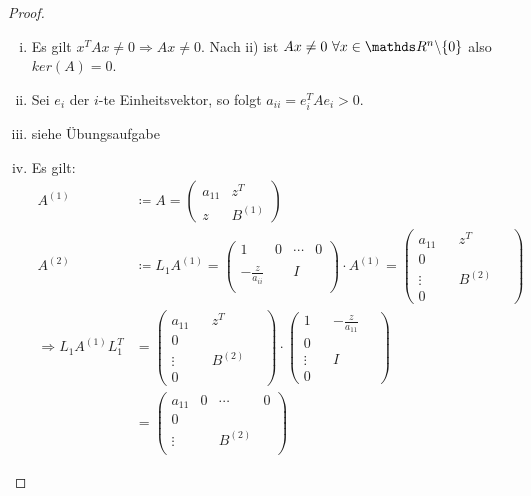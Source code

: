 \begin{proof}~
  \begin{enumerate}[i)]
  \item Es gilt $x^TAx\neq 0\Rightarrow Ax\neq 0$. 
    Nach ii) ist $Ax\neq 0~\forall x\in\Ren\backslash \{0\}$
    also $ker(A)=0$. %
  \item Sei $e_i$ der $i$-te Einheitsvektor, so folgt $a_{ii} = e_{i}^TAe_i > 0$.
  \item siehe Übungsaufgabe
  \item Es gilt:
    \begin{align*}
      A^{(1)} 
      &\coloneqq A = \begin{pmatrix}
        a_{11} & z^T \\ 
        z      & B^{(1)}
      \end{pmatrix} \\
      A^{(2)} 
      &\coloneqq L_1 A^{(1)} 
        = \begin{pmatrix}
          1 & 0 & \cdots & 0 \\ \\
          -\frac{z}{a_{ii}} && I \\ ~
        \end{pmatrix} 
      \cdot A^{(1)}
      = \begin{pmatrix}
        a_{11} &  & z^T & ~ \\ 
        0 \\
        \vdots && B^{(2)} \\ 
        0
      \end{pmatrix} \\
      \Longrightarrow L_1A^{(1)}L_1^T  
      &= \begin{pmatrix}
		a_{11} &  & z^T & ~ \\ 
		0 \\
		\vdots && B^{(2)} \\ 
		0
      \end{pmatrix} 
      \cdot  \begin{pmatrix}
        1 &  &	-\frac{z}{a_{11}} & ~ \\ 
        0 \\
        \vdots && I \\ 
        0
      \end{pmatrix}\\
      &= \begin{pmatrix}
		a_{11} & 0 & \cdots & 0\\ 
		0 \\
		\vdots && B^{(2)} \\ 

\end{pmatrix}
\end{align*}
\end{enumerate}
\end{proof}
